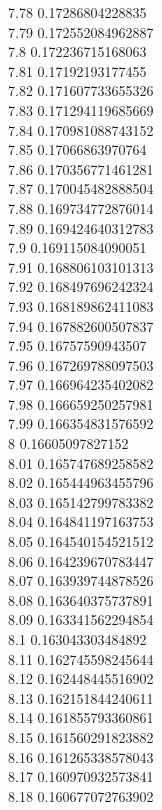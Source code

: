 {7.78	0.17286804228835\\
7.79	0.172552084962887\\
7.8	0.172236715168063\\
7.81	0.17192193177455\\
7.82	0.171607733655326\\
7.83	0.171294119685669\\
7.84	0.170981088743152\\
7.85	0.17066863970764\\
7.86	0.170356771461281\\
7.87	0.170045482888504\\
7.88	0.169734772876014\\
7.89	0.169424640312783\\
7.9	0.169115084090051\\
7.91	0.168806103101313\\
7.92	0.168497696242324\\
7.93	0.168189862411083\\
7.94	0.167882600507837\\
7.95	0.16757590943507\\
7.96	0.167269788097503\\
7.97	0.166964235402082\\
7.98	0.166659250257981\\
7.99	0.166354831576592\\
8	0.16605097827152\\
8.01	0.165747689258582\\
8.02	0.165444963455796\\
8.03	0.165142799783382\\
8.04	0.164841197163753\\
8.05	0.164540154521512\\
8.06	0.164239670783447\\
8.07	0.163939744878526\\
8.08	0.163640375737891\\
8.09	0.163341562294854\\
8.1	0.163043303484892\\
8.11	0.162745598245644\\
8.12	0.162448445516902\\
8.13	0.162151844240611\\
8.14	0.161855793360861\\
8.15	0.161560291823882\\
8.16	0.161265338578043\\
8.17	0.160970932573841\\
8.18	0.160677072763902\\
}
